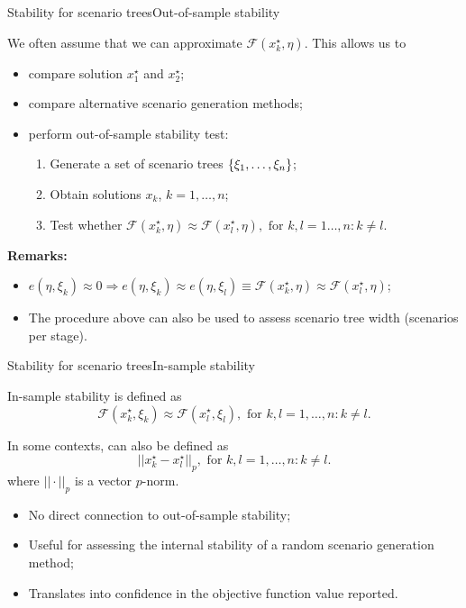 \begin{frame}{Stability for scenario trees}{Out-of-sample stability} 

	We often assume that we can \alert{approximate} $\mathcal{F}(x_k^\star, \eta)$. This allows us to
	\vspace{-6pt}
	\begin{itemize}
		\item compare solution $x_{1}^\star$ and $x_{2}^\star$;
		\item compare \alert{alternative} scenario generation methods;
		\item perform \alert{out-of-sample} stability test:
		\begin{enumerate}
			\item Generate a set of scenario trees $\left\{ \xi_1, \dots, \xi_n \right \}$;
			\item Obtain solutions $x_k$, $k=1,\dots,n$;	
			\item Test whether $\mathcal{F}(x_k^\star, \eta) \approx \mathcal{F}(x_l^\star, \eta), \text{ for } k,l = 1\dots, n : k \neq l$.
		\end{enumerate}
	\end{itemize}
	
	\pause
	{\bf Remarks:}
	\vspace{-6pt}
	\begin{itemize}
		\item $e(\eta, \xi_k) \approx 0 \Rightarrow e(\eta, \xi_k) \approx e(\eta, \xi_l) \equiv \mathcal{F}(x_k^\star,\eta) \approx \mathcal{F}(x_l^\star,\eta)$;
		\item The procedure above can also be used to \alert{assess scenario tree} width (scenarios per stage).
	\end{itemize}
	
\end{frame}



\begin{frame}{Stability for scenario trees}{In-sample stability}

	\alert{In-sample} stability is defined as
	$$
		\mathcal{F}(x_k^\star, \xi_k) \approx \mathcal{F}(x_l^\star, \xi_l), \text{ for } k,l = 1,\dots, n : k \neq l.
	$$
	
	\pause
	In some contexts, can also be defined as
	$$
		||x_k^\star - x_l^\star||_p, \text{ for } k,l = 1,\dots, n : k \neq l.
	$$
	where $|| \cdot ||_p$ is a vector $p$-norm.
	
	\pause
	\begin{itemize}
		\item No direct connection to \alert{out-of-sample} stability;
		\item Useful for assessing the \alert{internal} stability of a random scenario generation method;
		\item Translates into \alert{confidence} in the objective function value reported.
	\end{itemize}
	
\end{frame}

